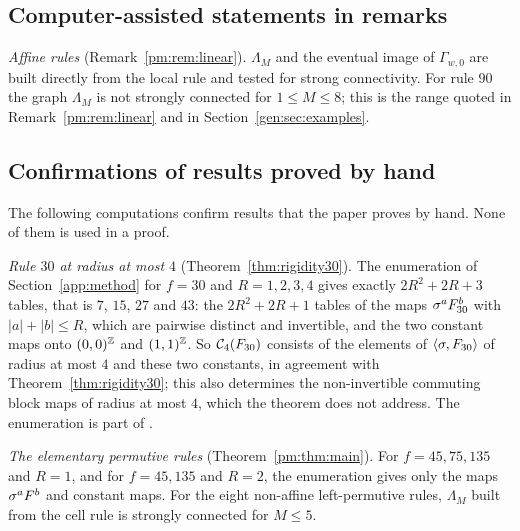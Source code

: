 \subsection{Computer-assisted statements in remarks}\label{app:stated}

\emph{Affine rules} (Remark~\ref{pm:rem:linear}). $\Lambda_M$ and the eventual image of $\Gamma_{w,0}$ are built directly from the local rule and tested for strong connectivity. For rule $90$ the graph $\Lambda_M$ is not strongly connected for $1\le M\le8$; this is the range quoted in Remark~\ref{pm:rem:linear} and in Section~\ref{gen:sec:examples}.

\subsection{Confirmations of results proved by hand}\label{app:confirm}

The following computations confirm results that the paper proves by hand. None of them is used in a proof.

\emph{Rule $30$ at radius at most $4$} (Theorem~\ref{thm:rigidity30}). The enumeration of Section~\ref{app:method} for $f=30$ and $R=1,2,3,4$ gives exactly $2R^2+2R+3$ tables, that is $7$, $15$, $27$ and $43$: the $2R^2+2R+1$ tables of the maps $\sigma^aF_{30}^b$ with $|a|+|b|\le R$, which are pairwise distinct and invertible, and the two constant maps onto $(0,0)^{\mathbb{Z}}$ and $(1,1)^{\mathbb{Z}}$. So $\mathcal{C}_4(F_{30})$ consists of the elements of $\langle\sigma,F_{30}\rangle$ of radius at most $4$ and these two constants, in agreement with Theorem~\ref{thm:rigidity30}; this also determines the non-invertible commuting block maps of radius at most $4$, which the theorem does not address. The enumeration is part of \cite{PaperD}.

\emph{The elementary permutive rules} (Theorem~\ref{pm:thm:main}). For $f=45,75,135$ and $R=1$, and for $f=45,135$ and $R=2$, the enumeration gives only the maps $\sigma^aF^b$ and constant maps. For the eight non-affine left-permutive rules, $\Lambda_M$ built from the cell rule is strongly connected for $M\le5$.

